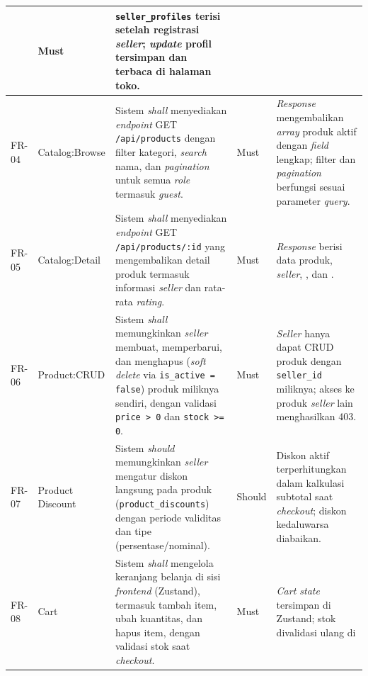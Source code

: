 \begin{longtable}{|L{0.9cm}|L{2.7cm}|L{5.5cm}|L{1.3cm}|L{4.6cm}|}
        & Must
        & \texttt{seller\_profiles} terisi setelah registrasi \textit{seller};
          \textit{update} profil tersimpan dan terbaca di halaman toko. \\
    \hline
    FR-04
        & Catalog:\newline Browse
        & Sistem \textit{shall} menyediakan \textit{endpoint} GET
          \texttt{/api/products} dengan filter kategori, \textit{search} nama,
          dan \textit{pagination} untuk semua \textit{role} termasuk \textit{guest}.
        & Must
        & \textit{Response} mengembalikan \textit{array} produk aktif dengan
          \textit{field} lengkap; filter dan \textit{pagination} berfungsi sesuai
          parameter \textit{query}. \\
    \hline
    FR-05
        & Catalog:\newline Detail
        & Sistem \textit{shall} menyediakan \textit{endpoint} GET
          \texttt{/api/products/:id} yang mengembalikan detail produk termasuk
          informasi \textit{seller} dan rata-rata \textit{rating}.
        & Must
        & \textit{Response} berisi data produk, 
          \textit{seller}, , dan . \\
    \hline
    FR-06
        & Product:\newline CRUD
        & Sistem \textit{shall} memungkinkan \textit{seller} membuat, memperbarui,
          dan menghapus (\textit{soft delete} via \texttt{is\_active = false})
          produk miliknya sendiri, dengan validasi \texttt{price > 0} dan
          \texttt{stock >= 0}.
        & Must
        & \textit{Seller} hanya dapat CRUD produk dengan \texttt{seller\_id}
          miliknya; akses ke produk \textit{seller} lain menghasilkan 403. \\
    \hline
    FR-07
        & Product Discount
        & Sistem \textit{should} memungkinkan \textit{seller} mengatur diskon
          langsung pada produk (\texttt{product\_discounts}) dengan periode
          validitas dan tipe (persentase/nominal).
        & Should
        & Diskon aktif terperhitungkan dalam kalkulasi subtotal saat
          \textit{checkout}; diskon kedaluwarsa diabaikan. \\
    \hline
    FR-08
        & Cart
        & Sistem \textit{shall} mengelola keranjang belanja di sisi
          \textit{frontend} (Zustand), termasuk tambah item, ubah kuantitas, dan
          hapus item, dengan validasi stok saat \textit{checkout}.
        & Must
        & \textit{Cart state} tersimpan di Zustand; stok divalidasi ulang di

\end{longtable}
